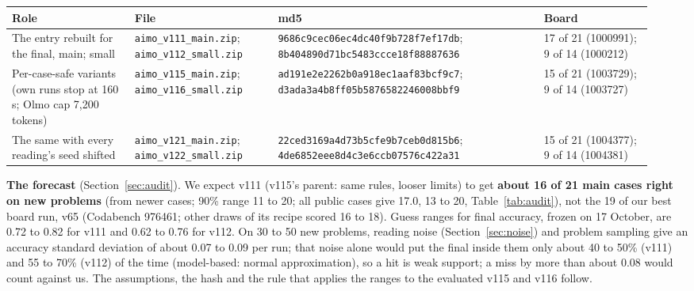 \documentclass{article}
\begin{document}
\begin{center}
\footnotesize
\setlength{\tabcolsep}{4pt}
\begin{tabular}{@{}p{0.18\linewidth}p{0.21\linewidth}p{0.39\linewidth}p{0.16\linewidth}@{}}
\toprule
Role & File & md5 & Board \\
\midrule
The entry rebuilt for the final, main; small & \texttt{aimo\_v111\_main.zip}; \texttt{aimo\_v112\_small.zip} &
\texttt{9686c9cec06ec4dc40f9b728f7ef17db}; \texttt{8b404890d71bc5483ccce18f88887636} & 17 of 21 (1000991); 9 of 14 (1000212) \\
Per-case-safe variants (own runs stop at 160\,s; Olmo cap 7,200 tokens) & \texttt{aimo\_v115\_main.zip}; \texttt{aimo\_v116\_small.zip} &
\texttt{ad191e2e2262b0a918ec1aaf83bcf9c7}; \texttt{d3ada3a4b8ff05b5876582246008bbf9} & 15 of 21 (1003729); 9 of 14 (1003727) \\
The same with every reading's seed shifted & \texttt{aimo\_v121\_main.zip}; \texttt{aimo\_v122\_small.zip} &
\texttt{22ced3169a4d73b5cfe9b7ceb0d815b6}; \texttt{4de6852eee8d4c3e6ccb07576c422a31} & 15 of 21 (1004377); 9 of 14 (1004381) \\
\bottomrule
\end{tabular}
\end{center}

\textbf{The forecast} (Section~\ref{sec:audit}). We expect v111 (v115's parent: same rules, looser limits) to get
\textbf{about 16 of 21 main cases right on new problems} (from newer cases; 90\% range 11 to 20; all public cases give
17.0, 13 to 20, Table~\ref{tab:audit}), not the 19 of our best board run, v65 (Codabench 976461; other draws of its recipe scored 16 to 18). Guess
ranges for final accuracy, frozen on 17 October, are 0.72 to 0.82 for v111 and 0.62 to 0.76 for v112.
On 30 to 50 new problems, reading noise (Section~\ref{sec:noise}) and problem sampling give an accuracy standard
deviation of about 0.07 to 0.09 per run; that noise alone would put the final inside them only about 40 to 50\% (v111) and 55 to 70\%
(v112) of the time (model-based: normal approximation), so a hit is weak support; a miss by more than about 0.08 would count against us. The
assumptions, the hash and the rule that applies the ranges to the evaluated v115 and v116 follow.
\end{document}
